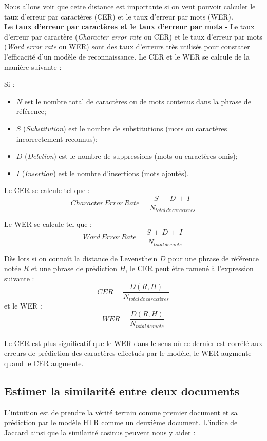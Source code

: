 Nous allons voir que cette distance est importante si on veut pouvoir calculer le taux d'erreur par caractères (CER) et le taux d'erreur par mots (WER).\\ 

\textbf{Le taux d'erreur par caractères et le taux d'erreur par mots -} Le taux d'erreur par caractère (\textit{Character error rate} ou CER) et le taux d'erreur par mots (\textit{Word error rate} ou WER) sont des taux d'erreurs très utilisés pour constater l'efficacité d'un modèle de reconnaissance. Le CER et le WER se calcule de la manière suivante :

Si : 

\begin{itemize}
    \item $N$ est le nombre total de caractères ou de mots contenus dans la phrase de référence;
    \item $S$ (\textit{Substitution}) est le nombre de substitutions (mots ou caractères incorrectement reconnus);
    \item $D$ (\textit{Deletion}) est le nombre de suppressions (mots ou caractères omis);
    \item $I$ (\textit{Insertion}) est le nombre d'insertions (mots ajoutés).
\end{itemize}

Le CER se calcule tel que : $$ Character\, Error\, Rate = \frac{S\, + \,D\, + \,I\,}{N_{total\, de\, caracteres}} $$

Le WER se calcule tel que : $$ Word\, Error\, Rate = \frac{S\, + \,D\, + \,I\,}{N_{total\, de\, mots}} $$

Dès lors si on connaît la distance de Levensthein $D$ pour une phrase de référence notée $R$ et une phrase de prédiction $H$, le CER peut être ramené à l'expression suivante : $$CER = \frac{D(R,H)}{N_{total\, de\, caractères}}$$  et le WER :$$WER = \frac{D(R,H)}{N_{total\, de\, mots}}$$\\

Le CER est plus significatif que le WER dans le sens où ce dernier est corrélé aux erreurs de prédiction des caractères effectués par le modèle,  le WER augmente quand le CER augmente.

\newpage
\subsection{Estimer la similarité entre deux documents}

L'intuition est de prendre la vérité terrain comme premier document et sa prédiction par le modèle HTR comme un deuxième document. L'indice de Jaccard ainsi que la similarité cosinus peuvent nous y aider :\\

